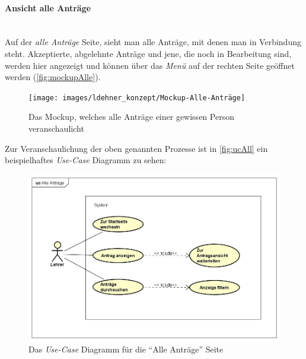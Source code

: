 \paragraph{Ansicht alle Anträge}
~\\
Auf der \textit{alle Anträge} Seite, sieht man alle Anträge, mit denen man in Verbindung steht. Akzeptierte, abgelehnte Anträge und jene, die noch in Bearbeitung sind, werden hier angezeigt und können über das \textit{Menü} auf der rechten Seite geöffnet werden (\autoref{fig:mockupAlle}).
\begin{figure}[H]
	\centering
	\texttt{[image: images/ldehner\_konzept/Mockup-Alle-Anträge]}
	\caption[Mockup Alle Anträge]{Das Mockup, welches alle Anträge einer gewissen Person veranschaulicht}
	\label{fig:mockupAlle}
\end{figure}
Zur Veranschaulichung der oben genannten Prozesse ist in \autoref{fig:ucAll} ein beispielhaftes \textit{Use-Case} Diagramm zu sehen: 
\begin{figure}[H]
	\centering
	\includegraphics[width=1\linewidth]{images/ldehner_konzept/uc-all}
	\caption[\textit{Use-Case} Diagramm Alle Anträge]{Das \textit{Use-Case} Diagramm für die \enquote{Alle Anträge} Seite}
	\label{fig:ucAll}
\end{figure}
\newpage
